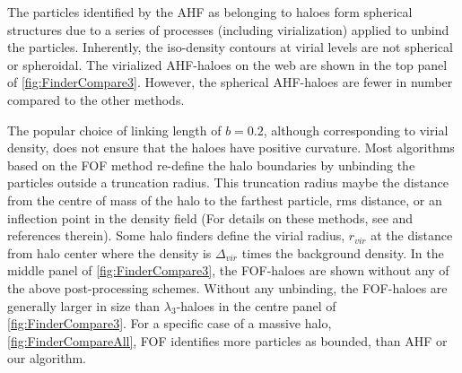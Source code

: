 \documentclass[fleqn,usenatbib,useAMS]{mnras}
\begin{document}
The particles identified by the AHF as belonging to haloes form spherical structures due to a series of processes (including virialization) applied to unbind the particles. Inherently, the iso-density contours at virial levels are not spherical or spheroidal. The virialized AHF-haloes on the web are shown in the top panel of \autoref{fig:FinderCompare3}. However, the spherical AHF-haloes are fewer in number compared to the other methods. 

The popular choice of linking length of $b=0.2$, although corresponding to virial density, does not ensure that the haloes have positive curvature. Most algorithms based on the FOF method re-define the halo boundaries by unbinding the particles outside a truncation radius. This truncation radius maybe the distance from the centre of mass of the halo to the farthest particle, rms distance, or an inflection point in the density field (For details on these methods, see \citealt{Knebe2011a} and references therein). Some halo finders define the virial radius, $r_{vir}$ at the distance from halo center where the density is $\Delta_{vir}$ times the background density. In the middle panel of \autoref{fig:FinderCompare3}, the FOF-haloes are shown without any of the above post-processing schemes. Without any unbinding, the FOF-haloes are generally larger in size than $\lambda_3$-haloes in the centre panel of \autoref{fig:FinderCompare3}. For a specific case of a massive halo, \autoref{fig:FinderCompareAll}, FOF identifies more particles as bounded, than AHF or our algorithm.  
\end{document}
